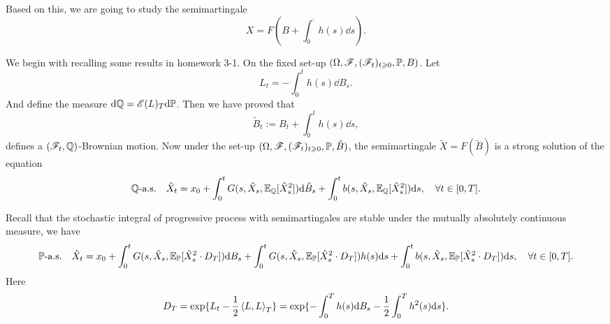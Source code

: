 \documentclass[8pt,onesided]{article}
\begin{document}
Based on this, we are going to study the semimartingale
\begin{equation*}
    X=F(B+\int_0^{\cdot} h(s)\dd s).
\end{equation*}

We begin with recalling some results in homework 3-1. On the fixed set-up $(\Omega, \mathscr{F}, (\mathscr{F}_t)_{t\geqslant 0},\mathbb{P} ,B)$. Let 
\begin{equation*}
    L_t=-\int_0^t h(s)\dd B_s.
\end{equation*}
And define the measure $\dd\mathbb{Q}= \mathscr{E}(L)_T \dd \mathbb{P}$. Then we have proved that
\begin{equation*}
    \tilde{B}_t:=B_t+\int_0^t h(s)\dd s,
\end{equation*}
defines a $(\mathscr{F}_t,\mathbb{Q})$-Brownian motion. Now under the set-up $(\Omega, \mathscr{F},(\mathscr{F}_t)_{t\geqslant 0},\mathbb{P},\tilde{B})$, the semimartingale $\tilde{X}= F(\tilde{B})$ is a strong solution of the equation
\begin{equation*}
   \mathbb{Q}\text{-a.s.}\quad \tilde X_t=x_0+\int_0^t G(s,\tilde X_s,\mathbb{E}_{\mathbb{Q}}[\tilde X_s^2]) \dd \tilde B_s+\int_0^t b(s,\tilde X_s,\mathbb{E}_{\mathbb{Q}}[\tilde X_s^2]) \dd s,\quad \forall t\in[0,T].
\end{equation*}

 Recall that the stochastic integral of progressive process with semimartingales are stable under the mutually absolutely continuous measure, we have
 \begin{equation*}
    \mathbb{P}\text{-a.s.}\quad\tilde X_t=x_0+\int_0^t G(s,\tilde X_s,\mathbb{E}_{\mathbb{P}}[\tilde X_s^2 \cdot D_T]) \dd  B_s+\int_0^t G(s,\tilde X_s,\mathbb{E}_{\mathbb{P}}[\tilde X_s^2 \cdot D_T]) h(s)\dd s+\int_0^t b(s,\tilde X_s,\mathbb{E}_{\mathbb{P}}[\tilde X_s^2 \cdot D_T]) \dd s,\quad \forall t\in[0,T].
 \end{equation*}
Here
\begin{equation*}
    D_T=\exp\{L_t-\frac{1}{2}\left\langle L,L\right\rangle_T\}=\exp\{-\int_0^T h(s)\dd B_s-\frac{1}{2} \int_0^T h^2(s)\dd s\}.
\end{equation*}
\end{document}
